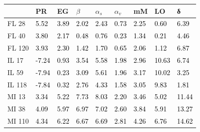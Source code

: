 \begin{tabular}{lllllllll}
\toprule
 & PR & EG & $β$ & $α_s$ & $α_v$ & mM & LO & δ \\
\midrule
FL 28 & \textcolor{black}{ 5.52 } & \textcolor{black}{ 3.89 } & \textcolor{black}{ 2.02 } & \textcolor{black}{ 2.43 } & \textcolor{black}{ 0.73 } & \textcolor{black}{ 2.25 } & \textcolor{black}{ 0.60 } & \textcolor{black}{ 6.39 } \\
FL 40 & \textcolor{black}{ 3.80 } & \textcolor{black}{ 2.17 } & \textcolor{black}{ 0.48 } & \textcolor{black}{ 0.76 } & \textcolor{black}{ 0.23 } & \textcolor{black}{ 1.34 } & \textcolor{black}{ 0.21 } & \textcolor{black}{ 4.46 } \\
FL 120 & \textcolor{black}{ 3.93 } & \textcolor{black}{ 2.30 } & \textcolor{black}{ 1.42 } & \textcolor{black}{ 1.70 } & \textcolor{black}{ 0.65 } & \textcolor{black}{ 2.06 } & \textcolor{black}{ 1.12 } & \textcolor{black}{ 6.87 } \\
IL 17 & \textcolor{black}{ -7.24 } & \textcolor{black}{ 0.93 } & \textcolor{black}{ 3.54 } & \textcolor{black}{ 5.58 } & \textcolor{black}{ 1.98 } & \textcolor{black}{ 2.96 } & \textcolor{black}{ 10.63 } & \textcolor{black}{ 6.74 } \\
IL 59 & \textcolor{black}{ -7.94 } & \textcolor{black}{ 0.23 } & \textcolor{black}{ 3.09 } & \textcolor{black}{ 5.61 } & \textcolor{black}{ 1.96 } & \textcolor{black}{ 3.17 } & \textcolor{black}{ 10.02 } & \textcolor{black}{ 3.25 } \\
IL 118 & \textcolor{black}{ -7.84 } & \textcolor{black}{ 0.32 } & \textcolor{black}{ 2.76 } & \textcolor{black}{ 4.33 } & \textcolor{black}{ 1.58 } & \textcolor{black}{ 3.05 } & \textcolor{black}{ 9.83 } & \textcolor{black}{ 1.81 } \\
MI 13 & \textcolor{black}{ 3.34 } & \textcolor{black}{ 5.22 } & \textcolor{black}{ 7.73 } & \textcolor{black}{ 8.03 } & \textcolor{black}{ 2.20 } & \textcolor{black}{ 3.46 } & \textcolor{black}{ 5.02 } & \textcolor{black}{ 11.44 } \\
MI 38 & \textcolor{black}{ 4.09 } & \textcolor{black}{ 5.97 } & \textcolor{black}{ 6.97 } & \textcolor{black}{ 7.02 } & \textcolor{black}{ 2.60 } & \textcolor{black}{ 3.84 } & \textcolor{black}{ 5.91 } & \textcolor{black}{ 13.27 } \\
MI 110 & \textcolor{black}{ 4.34 } & \textcolor{black}{ 6.22 } & \textcolor{black}{ 6.67 } & \textcolor{black}{ 6.69 } & \textcolor{black}{ 2.81 } & \textcolor{black}{ 4.26 } & \textcolor{black}{ 6.76 } & \textcolor{black}{ 14.62 } \\

\end{tabular}
